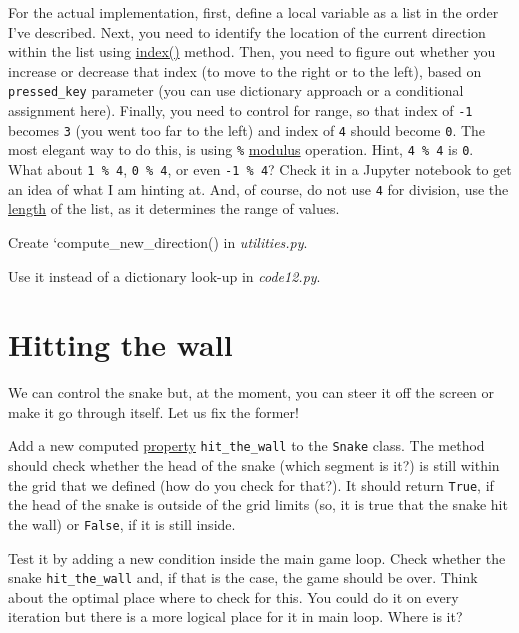 \documentclass[
]{book}
\begin{document}
For the actual implementation, first, define a local variable as a list in the order I've described. Next, you need to identify the location of the current direction within the list using \href{https://docs.python.org/3/tutorial/datastructures.html\#more-on-lists}{index()} method. Then, you need to figure out whether you increase or decrease that index (to move to the right or to the left), based on \texttt{pressed\_key} parameter (you can use dictionary approach or a conditional assignment here). Finally, you need to control for range, so that index of \texttt{-1} becomes \texttt{3} (you went too far to the left) and index of \texttt{4} should become \texttt{0}. The most elegant way to do this, is using \texttt{\%} \href{https://python-reference.readthedocs.io/en/latest/docs/operators/modulus.html}{modulus} operation. Hint, \texttt{4\ \%\ 4} is \texttt{0}. What about \texttt{1\ \%\ 4}, \texttt{0\ \%\ 4}, or even \texttt{-1\ \%\ 4}? Check it in a Jupyter notebook to get an idea of what I am hinting at. And, of course, do not use \texttt{4} for division, use the \href{https://docs.python.org/3/library/functions.html\#len}{length} of the list, as it determines the range of values.

Create `compute\_new\_direction() in \emph{utilities.py}.

Use it instead of a dictionary look-up in \emph{code12.py}.

\hypertarget{hitting-the-wall-1}{%
\section{Hitting the wall}\label{hitting-the-wall-1}}

We can control the snake but, at the moment, you can steer it off the screen or make it go through itself. Let us fix the former!

Add a new computed \protect\hyperlink{computed-attribute-property}{property} \texttt{hit\_the\_wall} to the \texttt{Snake} class. The method should check whether the head of the snake (which segment is it?) is still within the grid that we defined (how do you check for that?). It should return \texttt{True}, if the head of the snake is outside of the grid limits (so, it is true that the snake hit the wall) or \texttt{False}, if it is still inside.

Test it by adding a new condition inside the main game loop. Check whether the snake \texttt{hit\_the\_wall} and, if that is the case, the game should be over. Think about the optimal place where to check for this. You could do it on every iteration but there is a more logical place for it in main loop. Where is it?
\end{document}
